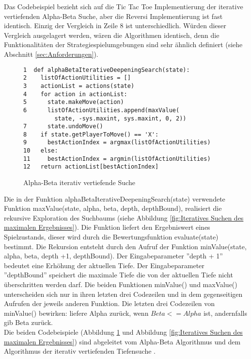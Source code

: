 Das Codebeispiel bezieht sich auf die Tic Tac Toe Implementierung der iterative vertiefenden Alpha-Beta Suche, aber die Reversi Implementierung ist fast identisch. Einzig der Vergleich in Zeile 8 ist unterschiedlich. Würden dieser Vergleich ausgelagert werden, wären die Algorithmen identisch, denn die Funktionalitäten der Strategiespielumgebungen sind sehr ähnlich definiert (siehe Abschnitt \ref{sec:Anforderungen}). \\

\begin{figure}[!htbp]
\centering
\begin{lstlisting}[frame=single, mathescape=true]
1  def alphaBetaIterativeDeepeningSearch(state):
2    listOfActionUtilities = []
3    actionList = actions(state)
4    for action in actionList:
5      state.makeMove(action)
6      listOfActionUtilities.append(maxValue(
         state, -sys.maxint, sys.maxint, 0, 2))
7      state.undoMove()
8    if state.getPlayerToMove() == 'X':
9      bestActionIndex = argmax(listOfActionUtilities)
10   else:
11     bestActionIndex = argmin(listOfActionUtilities)
12   return actionList[bestActionIndex]
\end{lstlisting}
\caption{Alpha-Beta iterativ vertiefende Suche}
\label{fig:Alpha-Beta iterativ vertiefende Suche}
\end{figure} 

Die in der Funktion alphaBetaIterativeDeepeningSearch(state) verwendete Funktion maxValue(state, alpha, beta, depth, depthBound), realisiert die rekursive Exploration des Suchbaums (siehe Abbildung \ref{fig:Iteratives Suchen des maximalen Ergebnisses}). Die Funktion liefert den Ergebniswert eines Spielzustands, dieser wird durch die Bewertungsfunktion evaluate(state) bestimmt. Die Rekursion entsteht durch den Aufruf der Funktion minValue(state, alpha, beta, depth +1, depthBound). Der Eingabeparameter ''depth + 1'' bedeutet eine Erhöhung der aktuellen Tiefe. Der Eingabeparameter ''depthBound'' speichert die maximale Tiefe die von der aktuellen Tiefe nicht überschritten werden darf. Die beiden Funktionen minValue() und maxValue() unterscheiden sich nur in ihren letzten drei Codezeilen und in dem gegenseitigen Aufrufen der jeweils anderen Funktion. Die letzten drei Codezeilen von minValue() bewirken: liefere Alpha zurück, wenn $Beta <= Alpha$ ist, andernfalls gib Beta zurück. \\

Die beiden Codebeispiele (Abbildung \ref{fig:Alpha-Beta iterativ vertiefende Suche} und Abbildung \ref{fig:Iteratives Suchen des maximalen Ergebnisses}) sind abgeleitet vom Alpha-Beta Algorithmus \cite[214 \psq]{Russell} und dem Algorithmus der iterativ vertiefenden Tiefensuche \cite[124]{Russell}.\\

